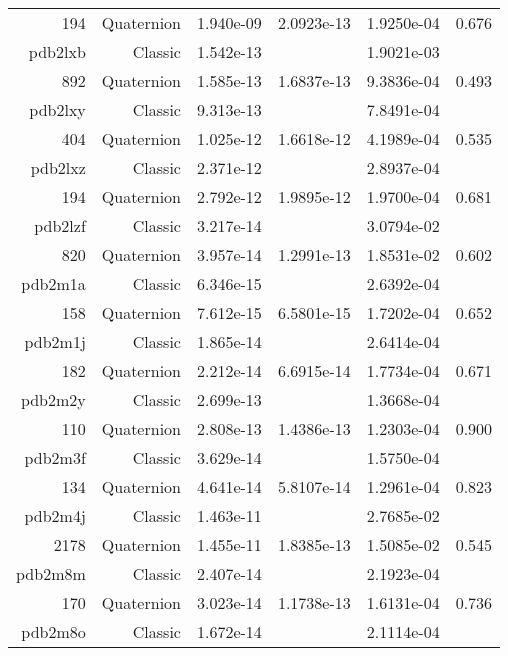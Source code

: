 \begin{xltabular}{\textwidth}{r|rS[table-format=1.3e+2]S[table-format=1.4e+2]S[table-format=1.4e+2]S[table-format=-1.3]}
194 & Quaternion & 1.940e-09 & 2.0923e-13 & 1.9250e-04 & 0.676\\  \addlinespace
{\color{red} pdb2lxb } & Classic & 1.542e-13 &  & 1.9021e-03 & \\
892 & Quaternion & 1.585e-13 & 1.6837e-13 & 9.3836e-04 & 0.493\\  \addlinespace
{\color{red} pdb2lxy } & Classic & 9.313e-13 &  & 7.8491e-04 & \\
404 & Quaternion & 1.025e-12 & 1.6618e-12 & 4.1989e-04 & 0.535\\  \addlinespace
{\color{red} pdb2lxz } & Classic & 2.371e-12 &  & 2.8937e-04 & \\
194 & Quaternion & 2.792e-12 & 1.9895e-12 & 1.9700e-04 & 0.681\\  \addlinespace
{\color{red} pdb2lzf } & Classic & 3.217e-14 &  & 3.0794e-02 & \\
820 & Quaternion & 3.957e-14 & 1.2991e-13 & 1.8531e-02 & 0.602\\  \addlinespace
{\color{red} pdb2m1a } & Classic & 6.346e-15 &  & 2.6392e-04 & \\
158 & Quaternion & 7.612e-15 & 6.5801e-15 & 1.7202e-04 & 0.652\\  \addlinespace
{\color{red} pdb2m1j } & Classic & 1.865e-14 &  & 2.6414e-04 & \\
182 & Quaternion & 2.212e-14 & 6.6915e-14 & 1.7734e-04 & 0.671\\  \addlinespace
{\color{red} pdb2m2y } & Classic & 2.699e-13 &  & 1.3668e-04 & \\
110 & Quaternion & 2.808e-13 & 1.4386e-13 & 1.2303e-04 & 0.900\\  \addlinespace
{\color{red} pdb2m3f } & Classic & 3.629e-14 &  & 1.5750e-04 & \\
134 & Quaternion & 4.641e-14 & 5.8107e-14 & 1.2961e-04 & 0.823\\  \addlinespace
{\color{red} pdb2m4j } & Classic & 1.463e-11 &  & 2.7685e-02 & \\
2178 & Quaternion & 1.455e-11 & 1.8385e-13 & 1.5085e-02 & 0.545\\  \addlinespace
{\color{red} pdb2m8m } & Classic & 2.407e-14 &  & 2.1923e-04 & \\
170 & Quaternion & 3.023e-14 & 1.1738e-13 & 1.6131e-04 & 0.736\\  \addlinespace
{\color{red} pdb2m8o } & Classic & 1.672e-14 &  & 2.1114e-04 & \\

\end{xltabular}
